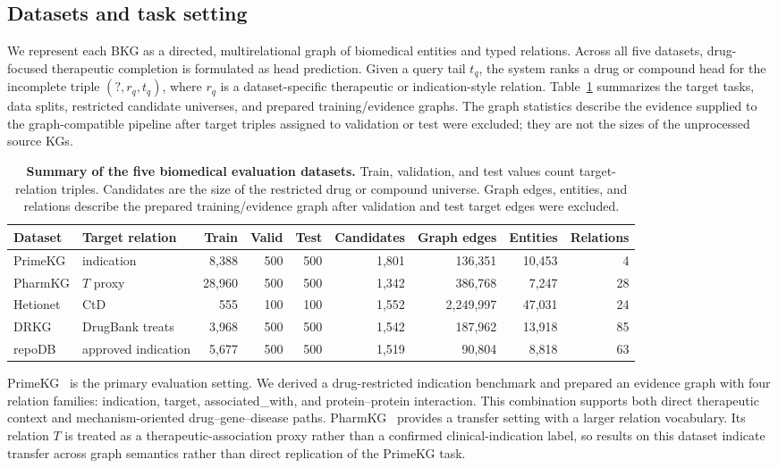 \documentclass[pdflatex,sn-mathphys-num]{sn-jnl}
\newcommand{\tabref}[1]{Table~\ref{#1}}
\begin{document}
\subsection{Datasets and task setting}
\label{sec:study_datasets}

We represent each BKG as a directed, multirelational graph of biomedical entities and typed relations. Across all five datasets, drug-focused therapeutic completion is formulated as head prediction. Given a query tail $t_q$, the system ranks a drug or compound head for the incomplete triple $(?,r_q,t_q)$, where $r_q$ is a dataset-specific therapeutic or indication-style relation. \tabref{tab:dataset_summary} summarizes the target tasks, data splits, restricted candidate universes, and prepared training/evidence graphs. The graph statistics describe the evidence supplied to the graph-compatible pipeline after target triples assigned to validation or test were excluded; they are not the sizes of the unprocessed source KGs.

\begin{table}[!t]
\caption{\textbf{Summary of the five biomedical evaluation datasets.} Train, validation, and test values count target-relation triples. Candidates are the size of the restricted drug or compound universe. Graph edges, entities, and relations describe the prepared training/evidence graph after validation and test target edges were excluded.}
\label{tab:dataset_summary}
\centering
{\fontsize{8.0pt}{8.8pt}\selectfont
\setlength{\tabcolsep}{2.2pt}
\renewcommand{\arraystretch}{1.08}
\begin{tabular*}{\textwidth}{@{\extracolsep{\fill}}llrrrrrrr@{}}
\toprule
Dataset & Target relation & Train & Valid & Test & Candidates & Graph edges & Entities & Relations \\
\midrule
PrimeKG & indication & 8,388 & 500 & 500 & 1,801 & 136,351 & 10,453 & 4 \\
PharmKG & $T$ proxy & 28,960 & 500 & 500 & 1,342 & 386,768 & 7,247 & 28 \\
Hetionet & CtD & 555 & 100 & 100 & 1,552 & 2,249,997 & 47,031 & 24 \\
DRKG & DrugBank treats & 3,968 & 500 & 500 & 1,542 & 187,962 & 13,918 & 85 \\
repoDB & approved indication & 5,677 & 500 & 500 & 1,519 & 90,804 & 8,818 & 63 \\
\bottomrule
\end{tabular*}}
\end{table}

PrimeKG~\citep{chandak2023building} is the primary evaluation setting. We derived a drug-restricted indication benchmark and prepared an evidence graph with four relation families: indication, target, associated\_with, and protein--protein interaction. This combination supports both direct therapeutic context and mechanism-oriented drug--gene--disease paths. PharmKG~\citep{zheng2021pharmkg} provides a transfer setting with a larger relation vocabulary. Its relation $T$ is treated as a therapeutic-association proxy rather than a confirmed clinical-indication label, so results on this dataset indicate transfer across graph semantics rather than direct replication of the PrimeKG task.
\end{document}

